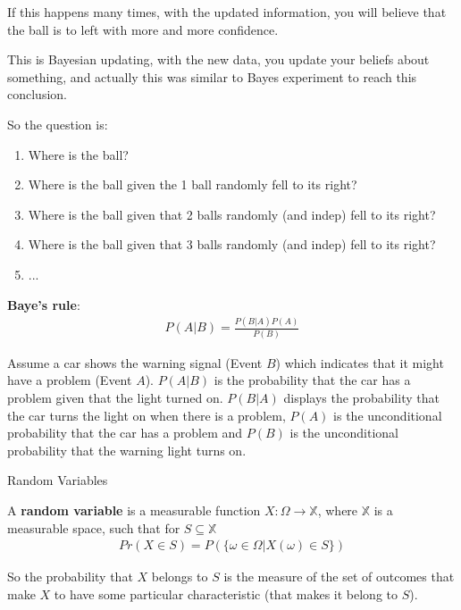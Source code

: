 \documentclass[aspectratio=169]{beamer}
\begin{document}
\begin{frame}
    
    If this happens many times, with the updated information, you will believe that the ball is to left with more and more confidence.
    \vspace{0.3cm}
    
    This is Bayesian updating, with the new data, you update your beliefs about something, and actually this was similar to Bayes experiment to reach this conclusion.
    
\end{frame}

\begin{frame}
    So the question is:
    \begin{enumerate}
        \item Where is the ball?
        \item Where is the ball given the 1 ball randomly fell to its right?
        \item Where is the ball given that 2 balls randomly (and indep) fell to its right?
        \item Where is the ball given that 3 balls randomly (and indep) fell to its right?
        \item ...
    \end{enumerate}
\end{frame}

\begin{frame}
\textbf{Baye's rule}:
    \begin{align*}
        P(A|B)=\frac{P(B|A)P(A)}{P(B)}
    \end{align*}
    \begin{example}
    Assume a car shows the warning signal (Event $B$) which indicates that it might have a problem (Event $A$). $P(A|B)$ is the probability that the car has a problem given that the light turned on. $P(B|A)$ displays the probability that the car turns the light on when there is a problem, $P(A)$ is the unconditional probability that the car has a problem and $P(B)$ is the unconditional probability that the warning light turns on.
    \end{example}
\end{frame}

\begin{frame}{Random Variables}
    \begin{definition}
        A \textbf{random variable} is a measurable function $X:\Omega\rightarrow \mathbb{X}$, where $\mathbb{X}$ is a measurable space, such that for $S\subseteq\mathbb{X}$
        \begin{align*}
            Pr(X\in S)=P(\{\omega\in\Omega | X(\omega)\in S\})
        \end{align*}
    \end{definition}
    \vspace{0.5cm}
    So the probability that $X$ belongs to $S$ is the measure of the set of outcomes that make $X$ to have some particular characteristic (that makes it belong to $S$).
\end{frame}
\end{document}
